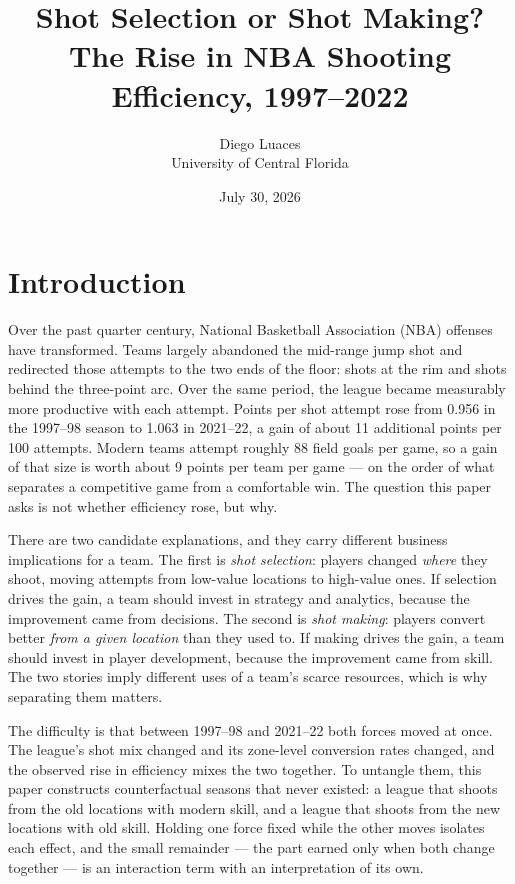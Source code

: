 \documentclass[12pt]{article}
\title{Shot Selection or Shot Making?\\
\large The Rise in NBA Shooting Efficiency, 1997--2022}
\author{Diego Luaces\\ University of Central Florida}
\date{July 30, 2026}
\begin{document}
\maketitle

\section{Introduction}

Over the past quarter century, National Basketball Association (NBA) offenses
have transformed. Teams largely abandoned the mid-range jump shot and
redirected those attempts to the two ends of the floor: shots at the rim and
shots behind the three-point arc. Over the same period, the league became
measurably more productive with each attempt. Points per shot attempt rose
from 0.956 in the 1997--98 season to 1.063 in 2021--22, a gain of about 11
additional points per 100 attempts. Modern teams attempt roughly 88 field
goals per game, so a gain of that size is worth about 9 points per team per
game --- on the order of what separates a competitive game from a comfortable
win. The question this paper asks is not whether efficiency rose, but why.

There are two candidate explanations, and they carry different business
implications for a team. The first is \emph{shot selection}: players changed
\emph{where} they shoot, moving attempts from low-value locations to
high-value ones. If selection drives the gain, a team should invest in
strategy and analytics, because the improvement came from decisions. The
second is \emph{shot making}: players convert better \emph{from a given
location} than they used to. If making drives the gain, a team should invest
in player development, because the improvement came from skill. The two
stories imply different uses of a team's scarce resources, which is why
separating them matters.

The difficulty is that between 1997--98 and 2021--22 both forces moved at
once. The league's shot mix changed and its zone-level conversion rates
changed, and the observed rise in efficiency mixes the two together. To
untangle them, this paper constructs counterfactual seasons that never
existed: a league that shoots from the old locations with modern skill, and a
league that shoots from the new locations with old skill. Holding one force
fixed while the other moves isolates each effect, and the small remainder ---
the part earned only when both change together --- is an interaction term
with an interpretation of its own.
\end{document}
